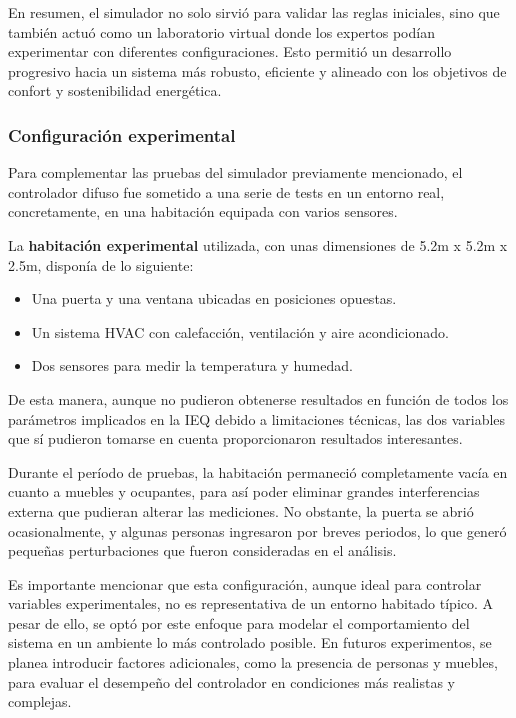 En resumen, el simulador no solo sirvió para validar las reglas iniciales, sino que también actuó como un laboratorio virtual donde los expertos podían experimentar con diferentes configuraciones. Esto permitió un desarrollo progresivo hacia un sistema más robusto, eficiente y alineado con los objetivos de confort y sostenibilidad energética.

\subsubsection{Configuración experimental}

Para complementar las pruebas del simulador previamente mencionado, el controlador difuso fue sometido a una serie de tests en un entorno real, concretamente, en una habitación equipada con varios sensores.

La \textbf{habitación experimental} utilizada, con unas dimensiones de 5.2m x 5.2m x 2.5m, disponía de lo siguiente:
\begin{itemize}
	\item Una puerta y una ventana ubicadas en posiciones opuestas.
	\item Un sistema HVAC con calefacción, ventilación y aire acondicionado.
	\item Dos sensores para medir la temperatura y humedad.
\end{itemize}

De esta manera, aunque no pudieron obtenerse resultados en función de todos los parámetros implicados en la IEQ debido a limitaciones técnicas, las dos variables que sí pudieron tomarse en cuenta proporcionaron resultados interesantes. 

Durante el período de pruebas, la habitación permaneció completamente vacía en cuanto a muebles y ocupantes, para así poder eliminar grandes interferencias externa que pudieran alterar las mediciones. No obstante, la puerta se abrió ocasionalmente, y algunas personas ingresaron por breves periodos, lo que generó pequeñas perturbaciones que fueron consideradas en el análisis.

Es importante mencionar que esta configuración, aunque ideal para controlar variables experimentales, no es representativa de un entorno habitado típico. A pesar de ello, se optó por este enfoque para modelar el comportamiento del sistema en un ambiente lo más controlado posible. En futuros experimentos, se planea introducir factores adicionales, como la presencia de personas y muebles, para evaluar el desempeño del controlador en condiciones más realistas y complejas.


